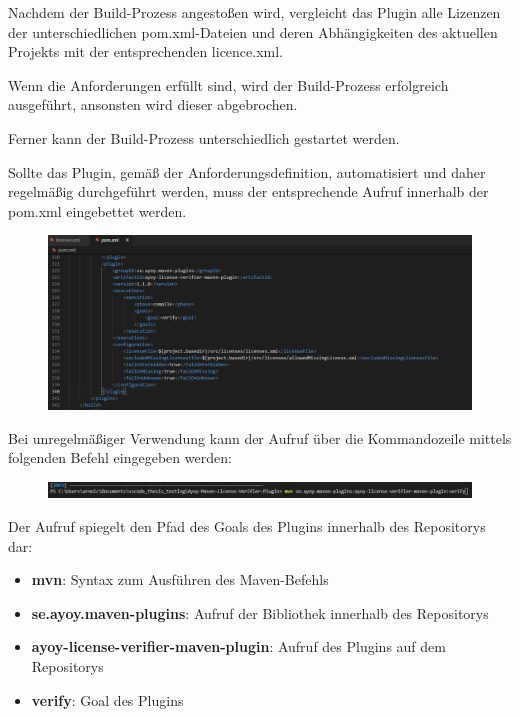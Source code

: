 Nachdem der Build-Prozess angestoßen wird, vergleicht das Plugin alle Lizenzen der unterschiedlichen pom.xml-Dateien und deren Abhängigkeiten des aktuellen Projekts mit der entsprechenden licence.xml. 

Wenn die Anforderungen erfüllt sind, wird der Build-Prozess erfolgreich ausgeführt, ansonsten wird dieser abgebrochen. 

Ferner kann der Build-Prozess unterschiedlich gestartet werden. 

Sollte das Plugin, gemäß der Anforderungsdefinition, automatisiert und daher regelmäßig durchgeführt werden, muss der entsprechende Aufruf innerhalb der pom.xml eingebettet werden. 

\begin{figure}[h]
    \centering
    \includegraphics[scale=0.5]{Bilder/PluginConfigurationzumAufruf.png}
\end{figure}

Bei unregelmäßiger Verwendung kann der Aufruf über die Kommandozeile mittels folgenden Befehl eingegeben werden:  

\begin{figure}[h]
    \centering
    \includegraphics[scale=0.5]{Bilder/mvn-Aufruf.png}
\end{figure}

Der Aufruf spiegelt den Pfad des Goals des Plugins innerhalb des Repositorys dar: 

\begin{itemize}
    \item \textbf{mvn}: Syntax zum Ausführen des Maven-Befehls
    \item \textbf{se.ayoy.maven-plugins}: Aufruf der Bibliothek innerhalb des Repositorys
    \item \textbf{ayoy-license-verifier-maven-plugin}: Aufruf des Plugins auf dem Repositorys
    \item \textbf{verify}: Goal des Plugins
\end{itemize}

